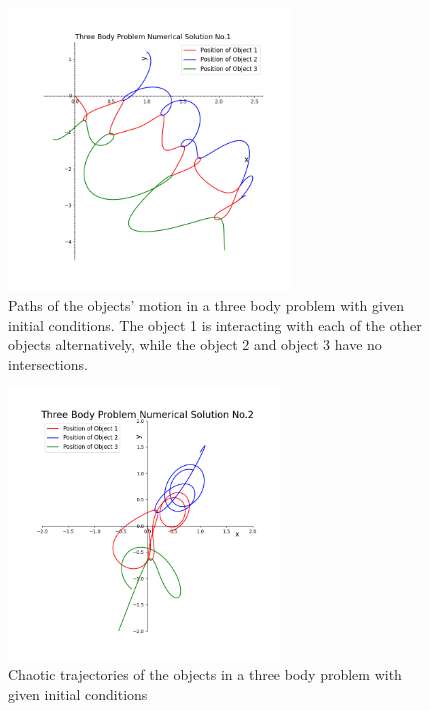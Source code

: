 \begin{figure}
    \includegraphics[width=7.5cm]{Three Body Problem Numerical Solution 1.png}
    \caption{Paths of the objects' motion in a three body problem with given initial conditions. The object 1 is interacting with each of the other objects alternatively, while the object 2 and object 3 have no intersections.}
    \label{Numerical Three Body 2D NO.1}
\end{figure}

\begin{figure}
    \includegraphics[width=7.2cm]{Three Body Problem Numerical Solution 2.png}
    \caption{Chaotic trajectories of the objects in a three body problem with given initial conditions}
    \label{Numerical Three Body 2D NO.2}
\end{figure}

